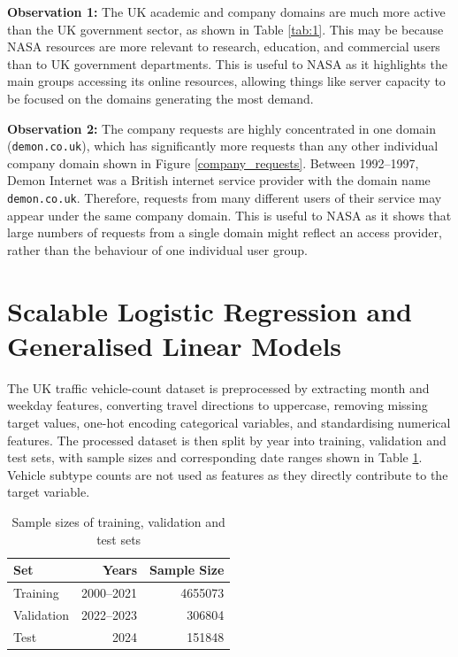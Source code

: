 \documentclass[12pt, a4paper]{article}
\begin{document}
\textbf{Observation 1:}
The UK academic and company domains are much more active than the UK government sector, as shown in Table \ref{tab:1}.
This may be because NASA resources are more relevant to research, education, and commercial users than to UK government departments.
This is useful to NASA as it highlights the main groups accessing its online resources, allowing things like server capacity to be focused on the domains generating the most demand.

\textbf{Observation 2:}
The company requests are highly concentrated in one domain (\texttt{demon.co.uk}), which has significantly more requests than any other individual company domain shown in Figure \ref{company_requests}.
Between 1992--1997, Demon Internet was a British internet service provider with the domain name \texttt{demon.co.uk}.
Therefore, requests from many different users of their service may appear under the same company domain.
This is useful to NASA as it shows that large numbers of requests from a single domain might reflect an access provider, rather than the behaviour of one individual user group.

\FloatBarrier
\section{Scalable Logistic Regression and Generalised Linear Models}
The UK traffic vehicle-count dataset is preprocessed by extracting month and weekday features, converting travel directions to uppercase, removing missing target values, one-hot encoding categorical variables, and standardising numerical features.
The processed dataset is then split by year into training, validation and test sets, with sample sizes and corresponding date ranges shown in Table \ref{tab:sample_sizes}.
Vehicle subtype counts are not used as features as they directly contribute to the target variable.
\begin{table}[htbp]
    \caption{Sample sizes of training, validation and test sets}
    \label{tab:sample_sizes}
    \centering
    \begin{tabular}{lrr}
        Set & Years & Sample Size \\
        \midrule
        Training & 2000--2021 & 4655073 \\
        Validation & 2022--2023 & 306804 \\
        Test & 2024 & 151848 \\
    \end{tabular}
\end{table}
\end{document}
